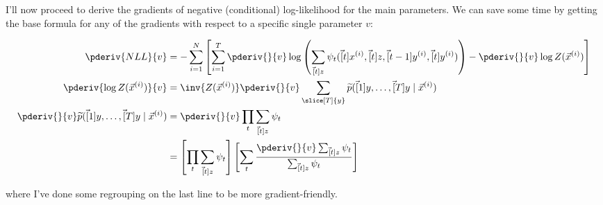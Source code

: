 \documentclass[11pt]{article}
\begin{document}
I'll now proceed to derive the gradients of negative (conditional) log-likelihood for the main parameters. We can save some time by getting the base formula for any of the gradients with respect to a specific single parameter $v$:
\begin{small}
	\begin{align}
	\pderiv{NLL}{v} 
	&=  - \sum_{i=1}^{N} \left[ \sum_{i = 1}^{T} \pderiv{}{v} \log \left( \sum_{\vec[t]{z}} \psi_t(\vec[t]{x}^{(i)}, \vec[t]{z}, \vec[t-1]{y}^{(i)}, \vec[t]{y}^{(i)}) \right) 
	- \pderiv{}{v} \log Z(\vec{x}^{(i)}) \right] \\
	\pderiv{\log Z(\vec{x}^{(i)})}{v}
	&= \inv{Z(\vec{x}^{(i)} )} \pderiv{}{v} \sum_{\slice[T]{y}} \widetilde{p}(\vec[1]{y},\ldots,\vec[T]{y} \mid \vec{x}^{(i)}) \\
	\pderiv{}{v}  \widetilde{p}(\vec[1]{y},\ldots,\vec[T]{y} \mid \vec{x}^{(i)}) 
	&= \pderiv{}{v} \prod_t \sum_{\vec[t]{z}} \psi_t \\
	&= \left[ \prod_t \sum_{\vec[t]{z}} \psi_t \right] \left[
	\sum_t \frac{\pderiv{}{v} \sum_{\vec[t]{z}}  \psi_t }{ \sum_{\vec[t]{z}} \psi_t   }
	\right]
	\end{align}
\end{small}
where I've done some regrouping on the last line to be more gradient-friendly.
\end{document}
